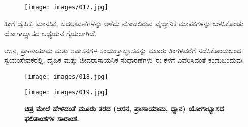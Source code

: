 \begin{figure}
\texttt{[image: images/017.jpg]}
\end{figure}

ಹೀಗೆ ದೈಹಿಕ, ಮಾನಸಿಕ,  ಬದಲಾವಣೆಗಳನ್ನು ಅಳೆದು ನೋಡಲಿರುವ ವೈಜ್ಞಾನಿಕ ಮಾಪಕಗಳನ್ನು ಬಳಸಿಕೊಂಡು ಯೋಗಾಭ್ಯಾಸದ ಅಧ್ಯಯನ ಗೈಯಲಾಗಿದೆ.

ಆಸನ, ಪ್ರಾಣಾಯಾಮ ಮತ್ತು ಶವಾಸನಗಳ ಸಂಯುಕ್ತಾಭ್ಯಾಸವನ್ನು ಮೂರು ತಿಂಗಳವರೆಗೆ ನಡೆಸಿಕೊಂಡುಬಂದ ಸ್ವಯಂಸೇವಕರಲ್ಲಿ, ದೈಹಿಕ ಮತ್ತು ಜೀವರಾಸಾಯನಿಕ ಸುಧಾರಣೆಗಳು ಈ ಕೆಳಗೆ ವಿವರಿಸಿದಂತೆ ಕಂಡುಬಂದುವು:

\begin{center}
\end{center}


\begin{figure}
\texttt{[image: images/018.jpg]}
\end{figure}


\begin{figure}
\texttt{[image: images/019.jpg]}
\caption{ \textbf{ಚಿತ್ರ  ಮೇಲೆ ಹೇಳಿದಂತೆ ಮೂರು ತರದ (ಆಸನ, ಪ್ರಾಣಾಯಾಮ, ಧ್ಯಾನ) ಯೋಗಾಭ್ಯಾಸದ ಫಲಿತಾಂಶಗಳ ಸಾರಾಂಶ.} }
\end{figure}

